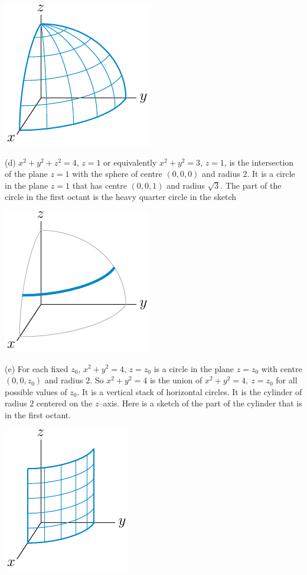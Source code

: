 \begin{solution}
\begin{center}
     \includegraphics{fig/quarterSphere.pdf}
\end{center}

(d) 
$x^2+y^2+z^2=4$, $z=1$ or equivalently $x^2+y^2=3$, $z=1$,
is the intersection of the plane $z=1$ with the sphere of centre 
$(0,0,0)$ and radius 2. It is a circle in the plane $z=1$ 
that has centre $(0,0,1)$ and radius $\sqrt{3}$. The part of the circle
in the first octant is the heavy quarter circle in the sketch

\begin{center}
     \includegraphics{fig/quarterCircle.pdf}
\end{center}

(e) 
For each fixed $z_0$, $x^2+y^2=4$, $z=z_0$ is a circle in the 
plane $z=z_0$ with centre $(0,0,z_0)$ and radius $2$. 
So $x^2+y^2=4$ is the union of $x^2+y^2=4,\ z=z_0$ for all 
possible values of $z_0$. It is  a vertical stack of horizontal 
circles. It is the cylinder of radius $2$ centered on the $z$--axis.
Here is a sketch of the part of the cylinder that is in the first octant.

\begin{center}
     \includegraphics{fig/quarterCylinder.pdf}
\end{center}



\end{solution}
